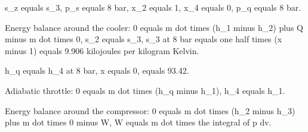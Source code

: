 s_z equals s_3,
p_s equals 8 bar,
x_2 equals 1,
x_4 equals 0,
p_q equals 8 bar.

Energy balance around the cooler:
0 equals m dot times (h_1 minus h_2) plus Q minus m dot times 0,
s_2 equals s_3,
s_3 at 8 bar equals one half times (x minus 1) equals 9.906 kilojoules per kilogram Kelvin.

h_q equals h_4 at 8 bar, x equals 0, equals 93.42.

Adiabatic throttle:
0 equals m dot times (h_q minus h_1),
h_4 equals h_1.

Energy balance around the compressor:
0 equals m dot times (h_2 minus h_3) plus m dot times 0 minus W,
W equals m dot times the integral of p dv.
